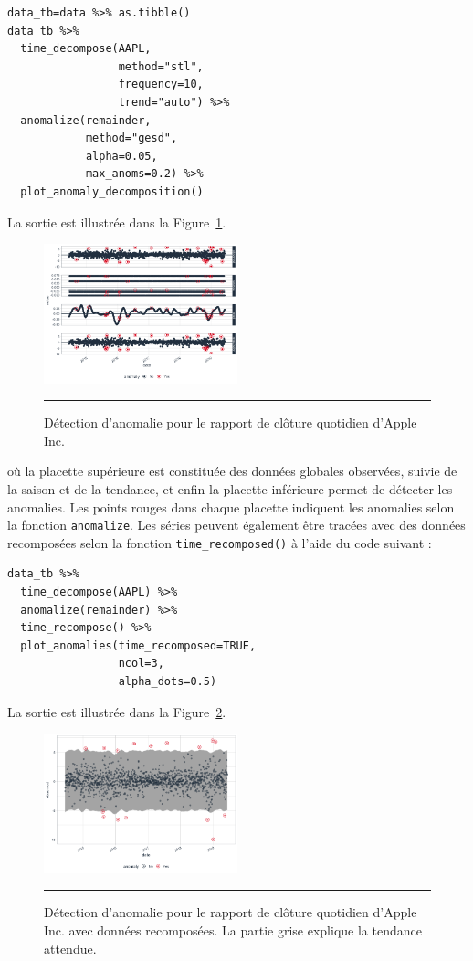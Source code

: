 \begin{lstlisting}
data_tb=data %>% as.tibble()
data_tb %>% 
  time_decompose(AAPL,
                 method="stl",
                 frequency=10,
                 trend="auto") %>%
  anomalize(remainder,
            method="gesd",
            alpha=0.05,
            max_anoms=0.2) %>%
  plot_anomaly_decomposition()
\end{lstlisting}
La sortie est illustrée dans la Figure~\ref{fig:apanomalies}.
\begin{figure}[t]
\centering
\includegraphics[width=0.5\textwidth]{ADOA/Images/Apanomalies.png}
\caption[\small Détection d'anomalie pour le rapport de clôture quotidien d'Apple Inc.]{\small Détection d'anomalie pour le rapport de clôture quotidien d'Apple Inc.}
\hrule\label{fig:apanomalies}
\end{figure}
\afterpage{\FloatBarrier}
où la placette supérieure est constituée des données globales observées, suivie de la saison et de la tendance, et enfin la placette inférieure permet de détecter les anomalies. Les points rouges dans chaque placette indiquent les anomalies selon la fonction \verb|anomalize|.  Les séries peuvent également être tracées avec des données recomposées selon la fonction \verb|time_recomposed()| à l'aide du code suivant :
\begin{lstlisting}
data_tb %>% 
  time_decompose(AAPL) %>% 
  anomalize(remainder) %>% 
  time_recompose() %>%  
  plot_anomalies(time_recomposed=TRUE,
                 ncol=3,
                 alpha_dots=0.5)
\end{lstlisting}
La sortie est illustrée dans la Figure~\ref{fig:apanomaliesrecomp}.
\begin{figure}[H]
\centering
\includegraphics[width=0.5\textwidth]{ADOA/Images/Apanomaliesrecomp.png}
\caption[\small Détection d'anomalie pour le rapport de clôture quotidien d'Apple Inc. avec données recomposées]{\small Détection d'anomalie pour le rapport de clôture quotidien d'Apple Inc. avec données recomposées. La partie grise explique la tendance attendue.}
\hrule\label{fig:apanomaliesrecomp}
\end{figure}
